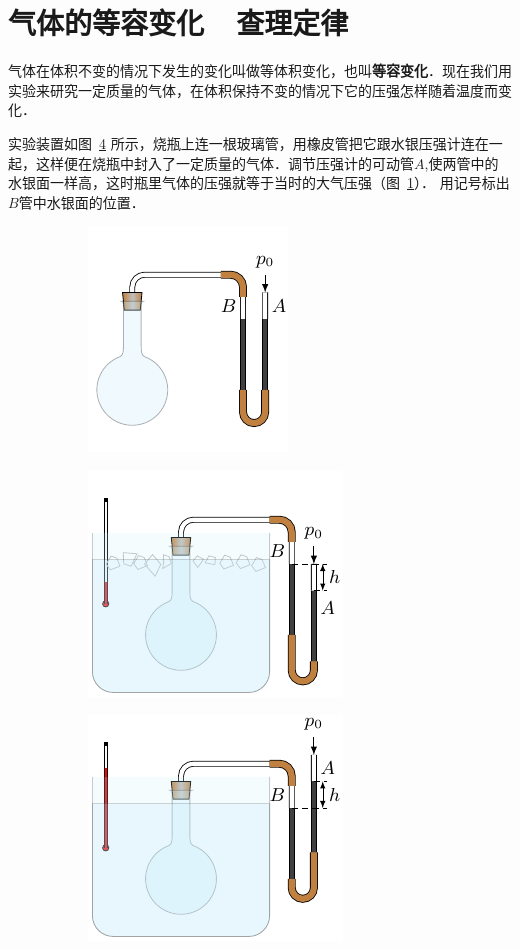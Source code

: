 \section{气体的等容变化~~查理定律}
气体在体积不变的情况下发生的变化叫做等体积变化，也叫\textbf{等容变化}．现在我们用实验来研究一定质量的气体，在体积保持不变的情况下它的压强怎样随着温度而变化．


实验装置如图~\ref{fig_B_3-9} 所示，烧瓶上连一根玻璃管，用橡皮管把它跟水银压强计连在一起，这样便在烧瓶中封入了一定质量的气体．调节压强计的可动管$A$,使两管中的水银面一样高，这时瓶里气体的压强就等于当时的大气压强（图~\ref{fig_B_3-9a}）．
用记号标出$B$管中水银面的位置．


\begin{figure}[htbp]
	\centering
	\begin{subfigure}{0.3\linewidth}
		\centering
		\includegraphics{fig/B/3-9a.pdf}
		\caption{}\label{fig_B_3-9a}
	\end{subfigure}
	\hfil
	\begin{subfigure}{0.3\linewidth}
		\centering
		\includegraphics{fig/B/3-9b.pdf}
		\caption{}\label{fig_B_3-9b}
	\end{subfigure}
	\hfil
	\begin{subfigure}{0.3\linewidth}
		\centering
		\includegraphics{fig/B/3-9c.pdf}
		\caption{}\label{fig_B_3-9c}
	\end{subfigure}
	\caption{}\label{fig_B_3-9}
\end{figure}


